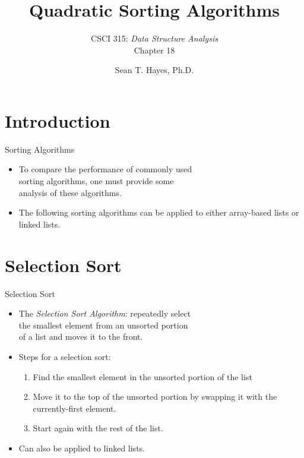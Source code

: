 \documentclass[14pt,aspectratio=1610]{beamer}
\title{\Huge{} Quadratic Sorting Algorithms}
\subtitle{CSCI 315: \textit{Data Structure Analysis}\\Chapter 18}
\author{Sean T. Hayes, Ph.D.}
\institute{Charleston Southern University}
\begin{document}
\begin{frame}
  \titlepage{}
\end{frame}
\section{Introduction}

\begin{frame}{Sorting Algorithms}

\begin{itemize}\setlength\itemsep{0.5em}
  \item
    To compare the performance of commonly used\\
    sorting algorithms, one must provide some\\ analysis of these algorithms.
  \item
    The following sorting algorithms can be applied to either array-based lists or linked lists.
\end{itemize}
\end{frame}

\section{Selection Sort}


\begin{frame}{Selection Sort}

\begin{itemize}\setlength\itemsep{0.5em}
  \item<1->
    The \emph{Selection Sort Algorithm}: repeatedly select\\ the smallest element from an unsorted portion\\ of a list and moves it to the front.
  \item<2->
    Steps for a selection sort:
    \begin{enumerate}
      \item
        Find the smallest element in the unsorted portion of the list
      \item
        Move it to the top of the unsorted portion by swapping it with the currently-first element.
      \item
        Start again with the rest of the list.
    \end{enumerate}
  \item<3->
    Can also be applied to linked lists.
\end{itemize}
\end{frame}
\end{document}

